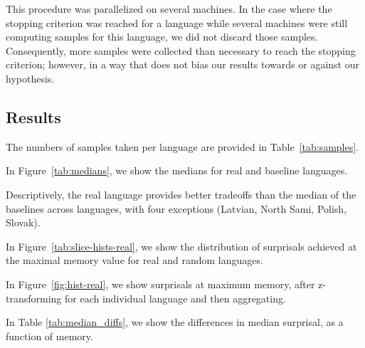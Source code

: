 \documentclass[11pt,letterpaper]{article}
\begin{document}
This procedure was parallelized on several machines.
In the case where the stopping criterion was reached for a language while several machines were still computing samples for this language, we did not discard those samples.
Consequently, more samples were collected than necessary to reach the stopping criterion; however, in a way that does not bias our results towards or against our hypothesis.







\subsection{Results}

The numbers of samples taken per language are provided in Table~\ref{tab:samples}.


In Figure~\ref{tab:medians}, we show the medians for real and baseline languages.

Descriptively, the real language provides better tradeoffs than the median of the baselines across languages, with four exceptions (Latvian, North Sami, Polish, Slovak).

In Figure~\ref{tab:slice-hists-real}, we show the distribution of surprisals achieved at the maximal memory value for real and random languages.

In Figure~\ref{fig:hist-real}, we show surprisals at maximum memory, after z-transforming for each individual language and then aggregating.

In Table \ref{tab:median_diffs}, we show the differences in median surprisal, as a function of memory.
\end{document}
